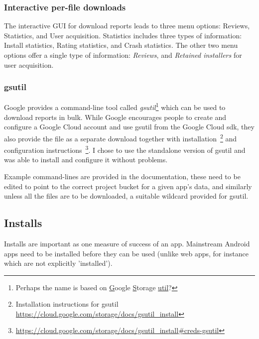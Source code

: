 \subsubsection{Interactive per-file downloads}
The interactive GUI for download reports leads to three menu options: Reviews, Statistics, and User acquisition. Statistics includes three types of information: Install statistics, Rating statistics, and Crash statistics. The other two menu options offer a single type of information: \emph{Reviews}, and \emph{Retained installers} for user acquisition.

\subsubsection{gsutil}
Google provides a command-line tool called \emph{gsutil}\footnote{Perhaps the name is based on \underline{G}oogle \underline{S}torage \underline{util}?} which can be used to download reports in bulk. While Google encourages people to create and configure a Google Cloud account and use gsutil from the Google Cloud sdk, they also provide the file as a separate download together with installation~\footnote{Installation instructions for gsutil \url{https://cloud.google.com/storage/docs/gsutil_install}} and configuration instructions~\footnote{\url{https://cloud.google.com/storage/docs/gsutil_install\#creds-gsutil}}. I chose to use the standalone version of gsutil and was able to install and configure it without problems.  

Example command-lines are provided in the documentation, these need to be edited to point to the correct project bucket for a given app's data, and similarly unless all the files are to be downloaded, a suitable wildcard provided for gsutil.  


\subsection{Installs}
Installs are important as one measure of success of an app. Mainstream Android apps need to be installed before they can be used (unlike web apps, for instance which are not explicitly 'installed'). 

